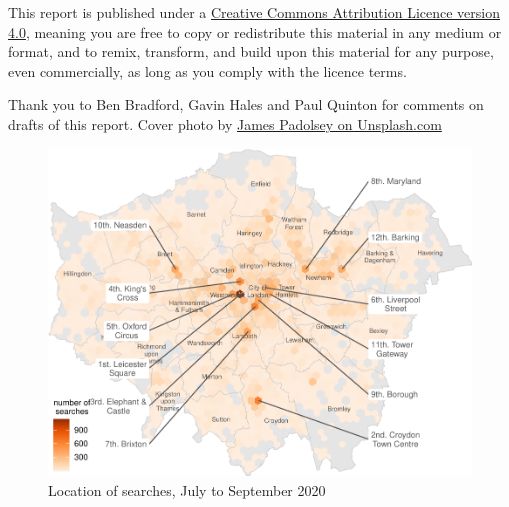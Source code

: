 \documentclass[
  a4paper,
  twoside, 11pt]{article}
\begin{document}
This report is published under a \href{https://creativecommons.org/licenses/by/4.0/}{Creative Commons Attribution Licence version 4.0}, meaning you are free to copy or redistribute this material in any medium or format, and to remix, transform, and build upon this material for any purpose, even commercially, as long as you comply with the licence terms.

Thank you to Ben Bradford, Gavin Hales and Paul Quinton for comments on drafts of this report. Cover photo by \href{https://unsplash.com/photos/tvPvROBv0F4}{James Padolsey on Unsplash.com}




\begin{figure}[tb]

{\centering \includegraphics[width=19cm]{2020-Q3_files/figure-latex/chart-map-1} 

}

\caption{Location of searches, July to September 2020}\label{fig:chart-map}
\end{figure}
\end{document}
